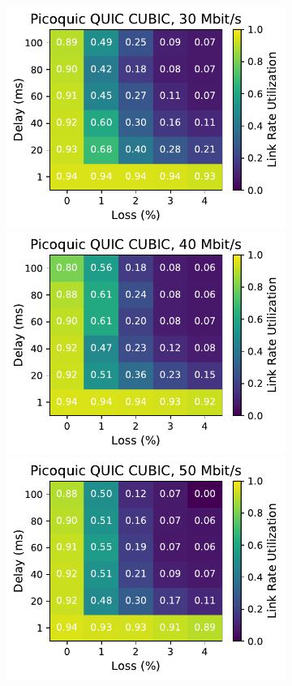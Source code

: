 \begin{figure}[ht]
\begin{subfigure}[b]{0.22\linewidth}
        \includegraphics[width=\linewidth,trim={0 0 2cm 0},clip]{figures/heatmaps/heatmap_picoquic_cubic_30mbps.pdf}
        \includegraphics[width=\linewidth,trim={0 0 2cm 0},clip]{figures/heatmaps/heatmap_picoquic_cubic_40mbps.pdf}
        \includegraphics[width=\linewidth,trim={0 0 2cm 0},clip]{figures/heatmaps/heatmap_picoquic_cubic_50mbps.pdf}

\end{subfigure}
\end{figure}
